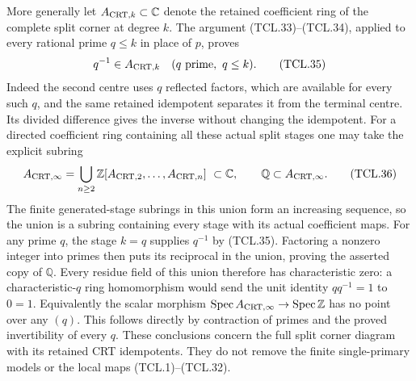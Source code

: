 More generally let \(A_{{\rm CRT},k}\subset\mathbb C\) denote the
retained coefficient ring of the complete split corner at degree
\(k\). The argument (TCL.33)--(TCL.34), applied to every rational
prime \(q\leq k\) in place of \(p\), proves
\[
 q^{-1}\in A_{{\rm CRT},k}\quad(q\text{ prime},\ q\leq k).
 \tag{TCL.35}\label{CFStage:eq:tcl-all-small-primes}
\]
Indeed the second centre uses \(q\) reflected factors, which are
available for every such \(q\), and the same retained idempotent
separates it from the terminal centre. Its divided difference
gives the inverse without changing the idempotent.
For a directed coefficient ring containing all these actual
split stages one may take the explicit subring
\[
 A_{{\rm CRT},\infty}
   =\bigcup_{n\geq2}
       \mathbb Z[A_{{\rm CRT},2},\ldots,A_{{\rm CRT},n}]
       \ \subset\mathbb C,\qquad
 \mathbb Q\subset A_{{\rm CRT},\infty}.
 \tag{TCL.36}\label{CFStage:eq:tcl-split-limit}
\]
The finite generated-stage subrings in this union form an
increasing sequence, so the union is a subring containing every
stage with its actual coefficient maps. For any prime \(q\),
the stage \(k=q\) supplies \(q^{-1}\) by (TCL.35).
Factoring a nonzero integer into primes then puts its reciprocal
in the union, proving the asserted copy of \(\mathbb Q\).
Every residue field of this union therefore has characteristic
zero: a characteristic-\(q\) ring homomorphism would send the
unit identity \(q q^{-1}=1\) to \(0=1\).
Equivalently the scalar morphism
\(\operatorname{Spec}A_{{\rm CRT},\infty}
 \to\operatorname{Spec}\mathbb Z\)
has no point over any \((q)\). This follows directly by contraction
of primes and the proved invertibility of every \(q\).
These conclusions concern the full split corner diagram with
its retained CRT idempotents. They do not remove the finite
single-primary models or the local maps (TCL.1)--(TCL.32).

